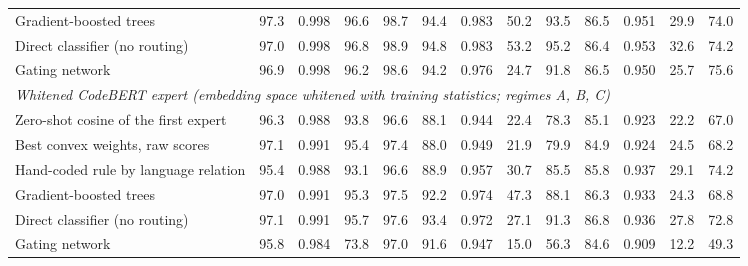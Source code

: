 \begin{table}[t]
\begin{tabular}{l|cccc|cccc|cccc}
Gradient-boosted trees & 97.3 & 0.998 & 96.6 & 98.7 & 94.4 & 0.983 & 50.2 & 93.5 & 86.5 & 0.951 & 29.9 & 74.0 \\
Direct classifier (no routing) & 97.0 & 0.998 & 96.8 & 98.9 & 94.8 & 0.983 & 53.2 & 95.2 & 86.4 & 0.953 & 32.6 & 74.2 \\
Gating network & 96.9 & 0.998 & 96.2 & 98.6 & 94.2 & 0.976 & 24.7 & 91.8 & 86.5 & 0.950 & 25.7 & 75.6 \\
\midrule
\multicolumn{13}{l}{\emph{Whitened CodeBERT expert (embedding space whitened with training statistics; regimes A, B, C)}} \\
Zero-shot cosine of the first expert & 96.3 & 0.988 & 93.8 & 96.6 & 88.1 & 0.944 & 22.4 & 78.3 & 85.1 & 0.923 & 22.2 & 67.0 \\
Best convex weights, raw scores & 97.1 & 0.991 & 95.4 & 97.4 & 88.0 & 0.949 & 21.9 & 79.9 & 84.9 & 0.924 & 24.5 & 68.2 \\
Hand-coded rule by language relation & 95.4 & 0.988 & 93.1 & 96.6 & 88.9 & 0.957 & 30.7 & 85.5 & 85.8 & 0.937 & 29.1 & 74.2 \\
Gradient-boosted trees & 97.0 & 0.991 & 95.3 & 97.5 & 92.2 & 0.974 & 47.3 & 88.1 & 86.3 & 0.933 & 24.3 & 68.8 \\
Direct classifier (no routing) & 97.1 & 0.991 & 95.7 & 97.6 & 93.4 & 0.972 & 27.1 & 91.3 & 86.8 & 0.936 & 27.8 & 72.8 \\
Gating network & 95.8 & 0.984 & 73.8 & 97.0 & 91.6 & 0.947 & 15.0 & 56.3 & 84.6 & 0.909 & 12.2 & 49.3 \\
\bottomrule
\end{tabular}
\end{table}